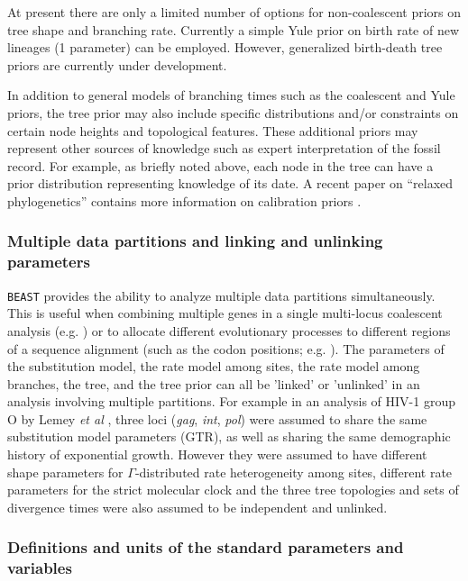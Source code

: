 \documentclass[cup7b, english]{cupbook}
\begin{document}
At present there are only a limited number of options for non-coalescent
priors on tree shape and branching rate. Currently a simple Yule prior
on birth rate of new lineages (1 parameter) can be employed. However,
generalized birth-death tree priors are currently under development.

In addition to general models of branching times such as the coalescent
and Yule priors, the tree prior may also include specific distributions
and/or constraints on certain node heights and topological features.
These additional priors may represent other sources of knowledge such
as expert interpretation of the fossil record. For example, as briefly
noted above, each node in the tree can have a prior distribution representing
knowledge of its date. A recent paper on ``relaxed phylogenetics''
contains more information on calibration priors \cite{DHPR2006}.

\subsubsection{Multiple data partitions and linking and unlinking parameters}

\texttt{BEAST} provides the ability to analyze multiple data partitions simultaneously.
This is useful when combining multiple genes in a single multi-locus
coalescent analysis (e.g. \cite{Lemeyetal2004}) or to allocate different
evolutionary processes to different regions of a sequence alignment
(such as the codon positions; e.g. \cite{PDNRR2003}). The parameters
of the substitution model, the rate model among sites, the rate model
among branches, the tree, and the tree prior can all be 'linked' or
'unlinked' in an analysis involving multiple partitions. For example
in an analysis of HIV-1 group O by Lemey \emph{et al} \cite{Lemeyetal2004},
three loci ({\it gag}, {\it int}, {\it pol}) were assumed to share the same substitution
model parameters (GTR), as well as sharing the same demographic history
of exponential growth. However they were assumed to have different
shape parameters for $\Gamma$-distributed rate heterogeneity among
sites, different rate parameters for the strict molecular clock and
the three tree topologies and sets of divergence times were also assumed
to be independent and unlinked.

\subsubsection{Definitions and units of the standard parameters and variables}
\end{document}
